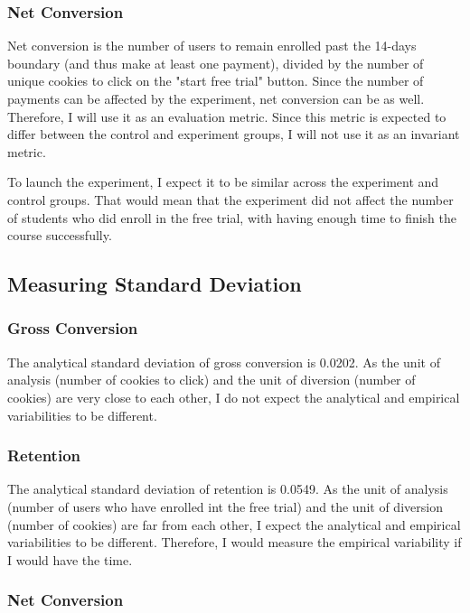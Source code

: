 \documentclass{article}
\begin{document}
\begin{multicols}{2}
\subsubsection{Net Conversion}

Net conversion is the number of users to remain enrolled past the 14-days boundary (and thus make at least one payment), divided by the number of unique cookies to click on the "start free trial" button. Since the number of payments can be affected by the experiment, net conversion can be as well. Therefore, I will use it as an evaluation metric. Since this metric is expected to differ between the control and experiment groups, I will not use it as an invariant metric.

To launch the experiment, I expect it to be similar across the experiment and control groups. That would mean that the experiment did not affect the number of students who did enroll in the free trial, with having enough time to finish the course successfully.

\subsection{Measuring Standard Deviation}

\subsubsection{Gross Conversion}

The analytical standard deviation of gross conversion is 0.0202. As the unit of analysis (number of cookies to click) and the unit of diversion (number of cookies) are very close to each other, I do not expect the analytical and empirical variabilities to be different.

\subsubsection{Retention}

The analytical standard deviation of retention is 0.0549. As the unit of analysis (number of users who have enrolled int the free trial) and the unit of diversion (number of cookies) are far from each other, I expect the analytical and empirical variabilities to be different. Therefore, I would measure the empirical variability if I would have the time.

\subsubsection{Net Conversion}


\end{multicols}
\end{document}

